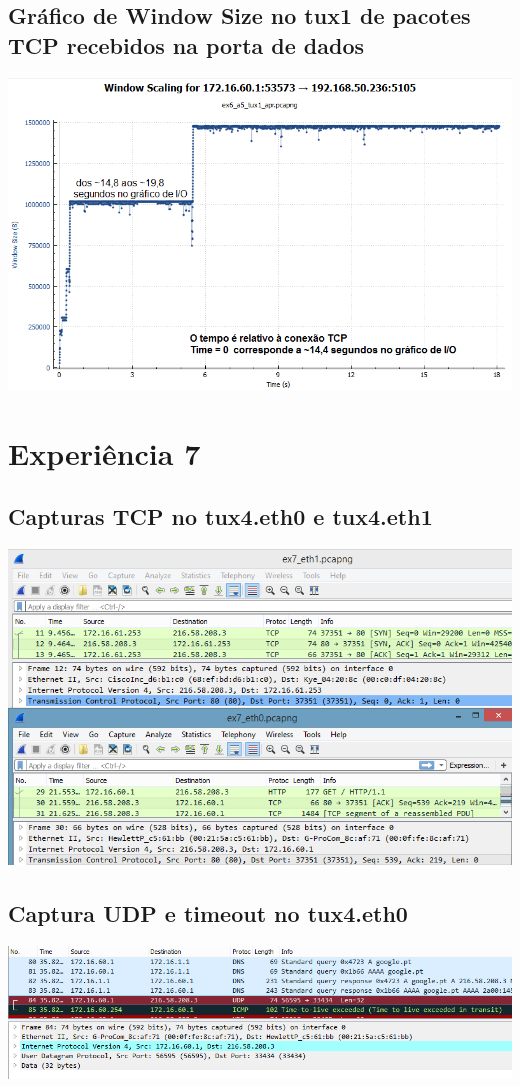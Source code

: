 \documentclass[11pt,a4paper,reqno]{report}
\numberwithin{equation}{section}
\begin{document}
\begin{appendices}
\subsection{Gráfico de Window Size no tux1 de pacotes TCP recebidos na porta de dados}
\label{ex6_window}
\includegraphics[width=16cm]{ex6_tux1_window.png}

\section{Experiência 7}%

\subsection{Capturas TCP no tux4.eth0 e tux4.eth1}
\label{ex7_tcp}
\includegraphics[width=16cm]{ex7_TCP.png}
\subsection{Captura UDP e timeout no tux4.eth0}
\label{ex7_udp}
\includegraphics[width=16cm]{ex7_udp_timeout.png}

\end{appendices}
\end{document}

